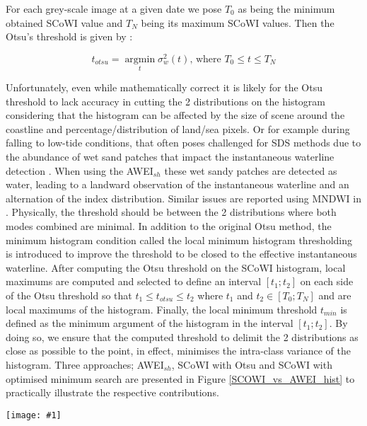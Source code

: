 \documentclass[remotesensing,article,submit,pdftex,moreauthors]{Definitions/mdpi}
\newcommand{\myfigure}[4]{
    \begin{figure*}[h!]
        \centering
        \texttt{[image: \#1]}	 
        \caption{\itshape#2}
        \label{#3}
    \end{figure*} 
}
\begin{document}
For each grey-scale image at a given date we pose $T_0$ as being the minimum obtained SCoWI value and $T_N$ being its maximum SCoWI values. Then the Otsu's threshold is given by :

\begin{equation}
    t_{otsu} = \operatorname*{argmin}_t \sigma_w^2(t) \text{, where }T_0 \le t \le T_N
\end{equation}

Unfortunately, even while mathematically correct it is likely for the Otsu threshold to lack accuracy in cutting the 2 distributions on the histogram considering that the histogram can be affected by the size of scene around the coastline and percentage/distribution of land/sea pixels. Or for example during falling to low-tide conditions, that often poses challenged for SDS methods due to the abundance of wet sand patches that impact the instantaneous waterline detection \citep{CASTELLE2021107707}. When using the AWEI$_{sh}$ these wet sandy patches are detected as water, leading to a landward observation of the instantaneous waterline and an alternation of the index distribution. Similar issues are reported using MNDWI in \citet{VOS2019_sub}. Physically, the threshold should be between the 2 distributions where both modes combined are minimal. In addition to the original Otsu method, the minimum histogram condition called the local minimum histogram thresholding is introduced to improve the threshold to be closed to the effective instantaneous waterline. After computing the Otsu threshold on the SCoWI histogram, local maximums are computed and selected to define an interval $[t_1 ; t_2]$ on each side of the Otsu threshold so that $t_1 \le t_{otsu} \le t_2$ where $t_1$ and $t_2 \in [T_0;T_N]$ and are local maximums of the histogram. Finally, the local minimum threshold $t_{min}$ is defined as the minimum argument of the histogram in the interval $[t_1 ; t_2]$. By doing so, we ensure that the computed threshold to delimit the 2 distributions as close as possible to the point, in effect, minimises the intra-class variance of the histogram. Three approaches; AWEI$_{sh}$, SCoWI with Otsu and SCoWI with optimised minimum search are presented in Figure \ref{SCOWI_vs_AWEI_hist} to practically illustrate the respective contributions.

\myfigure{img/AWEIsh_vs_SCOWI_crop.png}{a) AWEI$_{sh}$ histogram of this Sentinel-2 acquisition. The dashed blue line is the Otsu threshold value computed for this histogram. b) SCoWI histogram of this Sentinel-2 acquisition in which the dashed green line indicates the Otsu threshold value while the dashed red line shows the position of the local histogram minimum. c) Sentinel-2 acquisition at Capbreton, French Atlantic coast during low tide. Instantaneous waterlines are extracted through the 3 methods: cyan is AWEI$_{sh}$, green represents the SCoWI with Otsu and red shows the SCoWI with local minimum approach. Waterline extracted by the SCoWI combined to the local minimum histogram thresholding method (red line) is the closest to the actual waterline on the acquisition. }{SCOWI_vs_AWEI_hist}{0.8}
\end{document}
